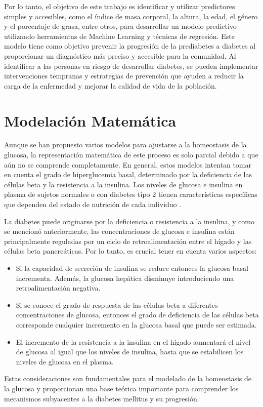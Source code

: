 Por lo tanto, el objetivo de este trabajo es identificar y utilizar predictores simples y accesibles, como el índice de masa corporal, la altura, la edad, el género y el porcentaje de grasa, entre otros, para desarrollar un modelo predictivo utilizando herramientas de Machine Learning y técnicas de regresión. Este modelo tiene como objetivo prevenir la progresión de la prediabetes a diabetes al proporcionar un diagnóstico más preciso y accesible para la comunidad. Al identificar a las personas en riesgo de desarrollar diabetes, se pueden implementar intervenciones tempranas y estrategias de prevención que ayuden a reducir la carga de la enfermedad y mejorar la calidad de vida de la población.


\section{Modelación Matemática}

Aunque se han propuesto varios modelos para ajustarse a la homeostasis de la glucosa, la representación matemática de este proceso es solo parcial debido a que aún no se comprende completamente. En general, estos modelos intentan tomar en cuenta el grado de hiperglucemia basal, determinado por la deficiencia de las células beta y la resistencia a la insulina. Los niveles de glucosa e insulina en plasma de sujetos normales o con diabetes tipo 2 tienen características específicas que dependen del estado de nutrición de cada individuo \cite{ModelacionMatematica2020}.

La diabetes puede originarse por la deficiencia o resistencia a la insulina, y como se mencionó anteriormente, las concentraciones de glucosa e insulina están principalmente reguladas por un ciclo de retroalimentación entre el hígado y las células beta pancreáticas. Por lo tanto, es crucial tener en cuenta varios aspectos:

\begin{itemize}
    \item Si la capacidad de secreción de insulina se reduce entonces la glucosa basal incrementa. Además, la glucosa hepática disminuye introduciendo una retroalimentación negativa. 

    \item Si se conoce el grado de respuesta de las células beta a diferentes concentraciones de glucosa, entonces el grado de deficiencia de las células beta corresponde cualquier incremento en la glucosa basal que puede ser estimada.

    \item El incremento de la resistencia a la insulina en el hígado aumentará el nivel de glucosa al igual que los niveles de insulina, hasta que se estabilicen los niveles de glucosa en el plasma.
\end{itemize}

Estas consideraciones son fundamentales para el modelado de la homeostasis de la glucosa y proporcionan una base teórica importante para comprender los mecanismos subyacentes a la diabetes mellitus y su progresión. \cite{InsulinDef}
